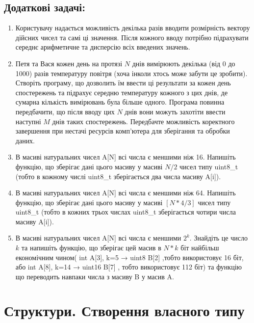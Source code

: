 \documentclass[a5paper,titlepage,openany,twoside,
]
{book_unv}%
\begin{document}
\section{Додаткові задачі:}

\begin{enumerate}
\def\labelenumi{\arabic{enumi})}
\setcounter{enumi}{8}
\item
  Користувачу надається можливість декілька разів вводити розмірність
  вектору дійсних чисел та самі ці значення. Після кожного вводу
  потрібно підрахувати середнє арифметичне та дисперсію всіх введених
  значень.
\item
  Петя та Вася кожен день на протязі $N$ днів вимірюють
  декілька (від 0 до 1000) разів температуру повітря (хоча інколи хтось
  може забути це зробити). Створіть програму, що дозволить їм ввести ці
  результати за кожен день спостережень та підрахує середню температуру
  кожного з цих днів, де сумарна кількість вимірювань була більше одного.
  Програма повинна передбачити, що після вводу цих $N$ днів вони можуть
  захотіти ввести наступні $M$ днів таких спостережень. Передбачте
  можливість коректного завершення при нестачі ресурсів комп'ютера для
  зберігання та обробки даних.
\item
 В масиві натуральних чисел A{[}N{]} всі числа є меншими ніж 16. Напишіть
  функцію, що зберігає дані цього масиву у масиві $N/2$ чисел типу
  uint8\_t (тобто в кожному числі uint8\_t зберігається два числа масиву
  A{[}i{]}).
\item
  В масиві натуральних чисел A{[}N{]} всі числа є меншими ніж 64. Напишіть
  функцію, що зберігає дані цього масиву у масиві $[N*4/3]$ чисел типу
  uint8\_t (тобто в кожних трьох числах uint8\_t зберігається чотири
  числа масиву A{[}i{]}).
\item
  В масиві натуральних чисел A{[}N{]} всі числа є меншими \(2^{k}\).
  Знайдіть це число $k$ та напишіть функцію, що зберігає цей масив в $N*k$
  біт найбільш економічним чином( int A{[}3{]}, k=5 → uint8 B{[}2{]}
  ,тобто використовує 16 біт, або int A{[}8{]}, k=14 → uint16 B{[}7{]} ,
  тобто використовує 112 біт) та функцію що переводить навпаки числа з
  масиву B у масив A.
\end{enumerate}



\chapter{Структури. Створення власного типу}
%
\end{document}
